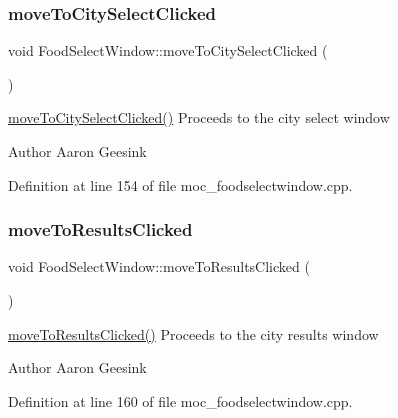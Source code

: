 \subsubsection{\texorpdfstring{moveToCitySelectClicked}{moveToCitySelectClicked}}
{\footnotesize\ttfamily void Food\+Select\+Window\+::move\+To\+City\+Select\+Clicked (\begin{DoxyParamCaption}{ }\end{DoxyParamCaption})\hspace{0.3cm}{\ttfamily [signal]}}



\mbox{\hyperlink{class_food_select_window_a0d2bb2f7e07f62e62c2920d989415d8c}{move\+To\+City\+Select\+Clicked()}} Proceeds to the city select window 

\begin{DoxyAuthor}{Author}
Aaron Geesink 
\end{DoxyAuthor}


Definition at line 154 of file moc\+\_\+foodselectwindow.\+cpp.

\mbox{\label{class_food_select_window_a76b0dfec8f72dfa4c336732a922287fc}} 
\subsubsection{\texorpdfstring{moveToResultsClicked}{moveToResultsClicked}}
{\footnotesize\ttfamily void Food\+Select\+Window\+::move\+To\+Results\+Clicked (\begin{DoxyParamCaption}{ }\end{DoxyParamCaption})\hspace{0.3cm}{\ttfamily [signal]}}



\mbox{\hyperlink{class_food_select_window_a76b0dfec8f72dfa4c336732a922287fc}{move\+To\+Results\+Clicked()}} Proceeds to the city results window 

\begin{DoxyAuthor}{Author}
Aaron Geesink 
\end{DoxyAuthor}


Definition at line 160 of file moc\+\_\+foodselectwindow.\+cpp.

\mbox{\label{class_food_select_window_a6df884d5b39d16a2708f8bcae205ecd5}} 
